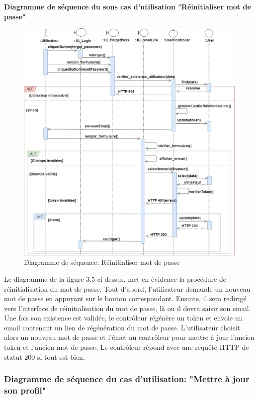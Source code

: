 \textbf{Diagramme de séquence du sous cas d'utilisation "Réinitialiser mot de passe"}\\
\begin{figure}[H]
	\centering
	\includegraphics[scale=0.4]{resetpassword.jpg}
	\caption{Diagramme de séquence: Réinitialiser mot de passe}
	\label{Diagramme de séquence: Réinitialiser mot de passe}
\end{figure}

Le diagramme de la figure 3.5 ci dessus, met en évidence la procédure de  réinitialisation du mot de passe. Tout d'abord, l'utilisateur demande un nouveau mot de passe en appuyant sur le bouton correspondant. Ensuite, il sera redirigé vers l'interface de réinitialisation du mot de passe, là ou il devra saisir son email. Une fois son existence est validée, le contrôleur régénère un token et envoie un email contenant un lien de régénération du mot de passe.
L'utilisateur choisit alors un nouveau mot de passe et l'émet au contrôleur pour mettre à jour l'ancien token et l'ancien mot  de passe. Le contrôleur répond avec une requête HTTP de statut 200 si tout est bien. 

\subsubsection{Diagramme de séquence du cas d'utilisation: "Mettre à jour son profil"}

